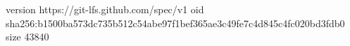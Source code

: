 version https://git-lfs.github.com/spec/v1
oid sha256:b1500ba573dc735b512c54abe97f1bef365ae3c49fe7c4d845c4fc020bd3fdb0
size 43840

